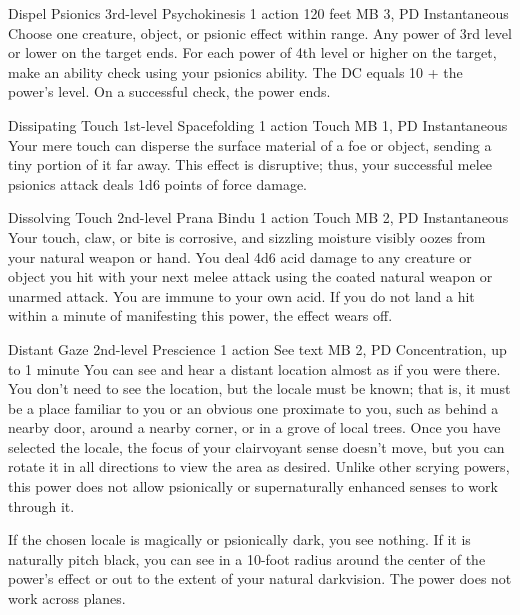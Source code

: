 \DndPowerHeader%
  {Dispel Psionics}
  {3rd-level Psychokinesis}
  {1 action}
  {120 feet}
  {MB 3, PD \lvlthree}
  {Instantaneous}
Choose one creature, object, or psionic effect within range.
Any power of 3rd level or lower on the target ends.
For each power of 4th level or higher on the target,
make an ability check using your psionics ability.
The DC equals 10 + the power's level.
On a successful check, the power ends.

\DndPowerHeader%
  {Dissipating Touch}
  {1st-level Spacefolding}
  {1 action}
  {Touch}
  {MB 1, PD \lvlone}
  {Instantaneous}
Your mere touch can disperse the surface material of a foe or object,
sending a tiny portion of it far away.
This effect is disruptive; thus,
your successful melee psionics attack deals 1d6 points of force damage.

\DndPowerHeader%
  {Dissolving Touch}
  {2nd-level Prana Bindu}
  {1 action}
  {Touch}
  {MB 2, PD \lvltwo}
  {Instantaneous}
Your touch, claw, or bite is corrosive,
and sizzling moisture visibly oozes from your
natural weapon or hand.
You deal 4d6 acid damage to any creature or object
you hit with your next melee attack using the coated
natural weapon or unarmed attack.
You are immune to your own acid.
If you do not land a hit within a minute
of manifesting this power,
the effect wears off.

  \DndPowerHeader%
  {Distant Gaze}
  {2nd-level Prescience}
  {1 action}
  {See text}
  {MB 2, PD \lvltwo}
  {Concentration, up to 1 minute}
You can see and hear a distant location
almost as if you were there.
You don't need to see the location,
but the locale must be known;
that is, it must be
a place familiar to you or an obvious one
proximate to you,
such as behind a nearby door,
around a nearby corner,
or in a grove of local trees.
Once you have selected the locale,
the focus of your clairvoyant sense doesn't move,
but you can rotate it in all directions
to view the area as desired.
Unlike other scrying powers,
this power does not allow psionically or supernaturally
enhanced senses to work through it.

If the chosen locale is magically or psionically dark,
you see nothing.
If it is naturally pitch black,
you can see in a 10-foot radius around the center
of the power's effect or out to the extent
of your natural darkvision.
The power does not work across planes.


